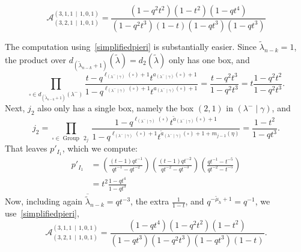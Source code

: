 \documentclass[ALCO]{cedram}
\newcommand{\mutilde}{{\widetilde{\mu}}}
\newcommand{\lambdatilde}{{\widetilde{\lambda}}}
\newcommand{\lambdamingamma}{(\lambda^- \mid \gamma)}
\newcommand{\leg}[1]{{\ell_{#1}(\square)}}
\newcommand{\armone}[1]{{\widetilde{a}_{#1}(\square)}}
\newcommand{\group}[1]{\operatorname{Group}\,\operatorname{#1}}
\newcommand{\jtwo}{j_2}
\begin{document}
\begin{exam}
\[ \mathcal{A}^{(3,1,1 \, \mid \, 1,0,1)}_{(3,2,1\, \mid \, 1,0,1)} = \frac{(1-q^2t^2)(1-t^2)(1-qt^4)}{(1-q^2t^3)(1-t)(1-qt^3)(1-qt^3)}\]

The computation using~\eqref{simplifiedpieri} is substantially easier. Since $\lambdatilde_{n-k} = 1$, the product over $d_{(\lambdatilde_{n-k}+1)}(\lambdatilde) = d_2(\lambdatilde)$ only has one box, and
\[ \prod_{\square \in d_{(\lambdatilde_{n-k}+1)}(\lambda^-)}\frac{t-q^{\ell_{\lambdamingamma}(\square)+1}t^{a_{\lambdamingamma}(\square)+1}}{1-q^{\ell_{\lambdamingamma}(\square)+1}t^{a_{\lambdamingamma}(\square)+1}} =  \frac{t-q^2t^3}{1-q^2t^3} = t \frac{1-q^2t^2}{1-q^2t^3}. \]
Next, $\jtwo$ also only has a single box, namely the box $(2,1)$ in $\lambdamingamma$, and
\[ \jtwo =\prod\limits_{\square \in \group{2}_j}\frac{1-q^{\leg{\lambdamingamma}}t^{\armone{\lambdamingamma}+1} }{ 1-q^{\leg{\lambdamingamma}+1}t^{\armone{\lambdamingamma}+1+m_{j-1}(\eta)}} =  \frac{1-t^2}{1-qt^3}.\]
That leaves $p'_{I_1}$, which we compute:
\begin{align*}
    p'_{I_1} &= \left(\frac{(t-1)qt^{-1}}{qt^{-1}-qt^{-2}} \right) \left( \frac{(t-1)qt^{-2}}{qt^{-2}-qt^{-3}}\right) \left( \frac{qt^{-1}-t^{-5}}{qt^{-2}-t^{-5}}\right)\\
    &=t^2 \frac{1-qt^4}{1-qt^3}
\end{align*}
Now, including again $\overline{\lambdatilde}_{n-k} = qt^{-3}$, the extra $\frac{1}{1-t}$, and $q^{-\mutilde_h + 1} = q^{-1}$, we use~\eqref{simplifiedpieri},
\[ \mathcal{A}^{(3,1,1 \, \mid \, 1,0,1)}_{(3,2,1\, \mid \, 1,0,1)} = \frac{(1-qt^4)(1-q^2t^2)(1-t^2)}{(1-qt^3)(1-q^2t^3)(1-qt^3)(1-t)}.\]
\end{exam}


\appendix
\end{document}
